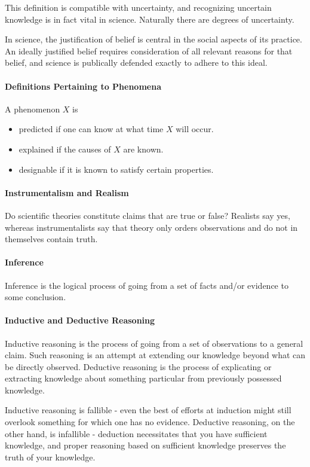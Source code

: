 This definition is compatible with uncertainty, and recognizing uncertain knowledge is in fact vital in science. Naturally there are degrees of uncertainty.

In science, the justification of belief is central in the social aspects of its practice. An ideally justified belief requires consideration of all relevant reasons for that belief, and science is publically defended exactly to adhere to this ideal.

\paragraph{Definitions Pertaining to Phenomena}
A phenomenon $X$ is
\begin{itemize}
	\item predicted if one can know at what time $X$ will occur.
	\item explained if the causes of $X$ are known.
	\item designable if it is known to satisfy certain properties.
\end{itemize}

\paragraph{Instrumentalism and Realism}
Do scientific theories constitute claims that are true or false? Realists say yes, whereas instrumentalists say that theory only orders observations and do not in themselves contain truth.

\paragraph{Inference}
Inference is the logical process of going from a set of facts and/or evidence to some conclusion.

\paragraph{Inductive and Deductive Reasoning}
Inductive reasoning is the process of going from a set of observations to a general claim. Such reasoning is an attempt at extending our knowledge beyond what can be directly observed. Deductive reasoning is the process of explicating or extracting knowledge about something particular from previously possessed knowledge.

Inductive reasoning is fallible - even the best of efforts at induction might still overlook something for which one has no evidence. Deductive reasoning, on the other hand, is infallible - deduction necessitates that you have sufficient knowledge, and proper reasoning based on sufficient knowledge preserves the truth of your knowledge.

